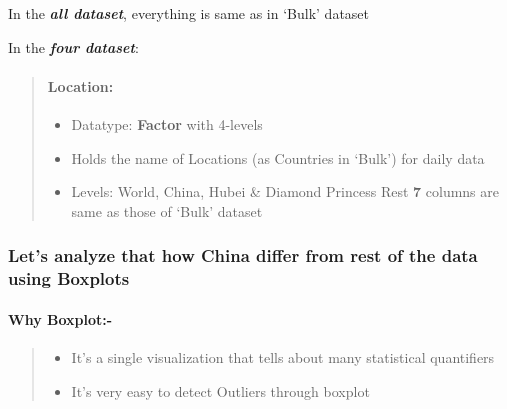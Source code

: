 \documentclass[11pt]{article}
\providecommand{\tightlist}{%
      \setlength{\itemsep}{0pt}\setlength{\parskip}{0pt}}
\begin{document}
     In the \textbf{\emph{all dataset}}, everything is same as in `Bulk'
dataset

In the \textbf{\emph{four dataset}}:

\begin{quote}
\mbox{}%
\hypertarget{location}{%
\paragraph{Location:}\label{location}}

\begin{itemize}
\tightlist
\item
  Datatype: \textbf{Factor} with 4-levels 
\item
  Holds the name of Locations (as Countries in `Bulk') for daily data 
\item
  Levels: World, China, Hubei \& Diamond Princess Rest \textbf{7}
  columns are same as those of `Bulk' dataset
\end{itemize}
\end{quote}

    \hypertarget{lets-analyze-that-how-china-differ-from-rest-of-the-data-using-boxplots}{%
\subsubsection{Let's analyze that how China differ from rest of the data
using
Boxplots}\label{lets-analyze-that-how-china-differ-from-rest-of-the-data-using-boxplots}}

\hypertarget{why-boxplot-}{%
\paragraph{\texorpdfstring{Why Boxplot:-
}{Why Boxplot:-  }}\label{why-boxplot-}}

\begin{quote}
\begin{itemize}
\tightlist
\item
  It's a single visualization that tells about many statistical
  quantifiers 
\item
  It's very easy to detect Outliers through boxplot 
\end{itemize}
\end{quote}
\end{document}

